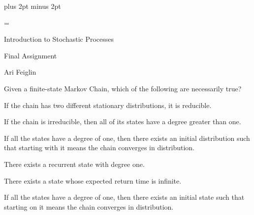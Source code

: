 

\parindent=0cm
\parskip=3pt plus 2pt minus 2pt





\footline={}

\def\printmcount{\the\counter{math counter}}


{

    \centerline{Introduction to Stochastic Processes}
    \smallskip
    \centerline{Final Assignment}
    \centerline{Ari Feiglin}

\eppbox}

\bigskip

\bexerc

    Given a finite-state Markov Chain, which of the following are necessarily true?
    \benum
        \item If the chain has two different stationary distributions, it is reducible.
        \item If the chain is irreducible, then all of its states have a degree greater than one.
        \item If all the states have a degree of one, then there exists an initial distribution such that starting with it means the chain converges in distribution.
        \item There exists a recurrent state with degree one.
        \item There exists a state whose expected return time is infinite.
        \item If all the states have a degree of one, then there exists an initial state such that starting on it means the chain converges in distribution.
    \eenum

\eexerc

